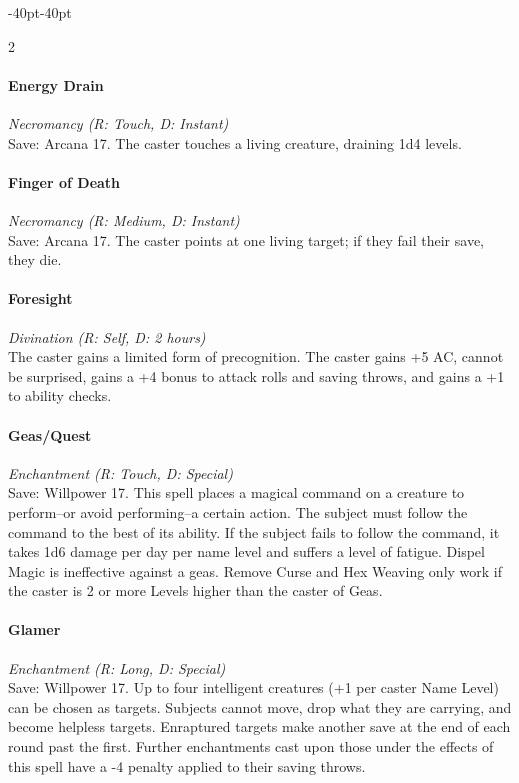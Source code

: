 \documentclass{book}
\begin{document}
\begin{adjustwidth}{-40pt}{-40pt}
\begin{multicols}{2}
\paragraph{Energy Drain}\label{energy-drain}

\emph{Necromancy (R: Touch, D: Instant)}\\
Save: Arcana 17. The caster touches a living creature, draining 1d4
levels.

\paragraph{Finger of Death}\label{finger-of-death}

\emph{Necromancy (R: Medium, D: Instant)}\\
Save: Arcana 17. The caster points at one living target; if they fail
their save, they die.

\paragraph{Foresight}\label{foresight}

\emph{Divination (R: Self, D: 2 hours)}\\
The caster gains a limited form of precognition. The caster gains +5 AC,
cannot be surprised, gains a +4 bonus to attack rolls and saving throws,
and gains a +1 to ability checks.

\paragraph{Geas/Quest}\label{geasquest}

\emph{Enchantment (R: Touch, D: Special)}\\
Save: Willpower 17. This spell places a magical command on a creature to
perform--or avoid performing--a certain action. The subject must follow
the command to the best of its ability. If the subject fails to follow
the command, it takes 1d6 damage per day per name level and suffers a
level of fatigue. Dispel Magic is ineffective against a geas. Remove
Curse and Hex Weaving only work if the caster is 2 or more Levels higher
than the caster of Geas.

\paragraph{Glamer}\label{glamer}

\emph{Enchantment (R: Long, D: Special)}\\
Save: Willpower 17. Up to four intelligent creatures (+1 per caster Name
Level) can be chosen as targets. Subjects cannot move, drop what they
are carrying, and become helpless targets. Enraptured targets make
another save at the end of each round past the first. Further
enchantments cast upon those under the effects of this spell have a -4
penalty applied to their saving throws.


\end{multicols}
\end{adjustwidth}
\end{document}
